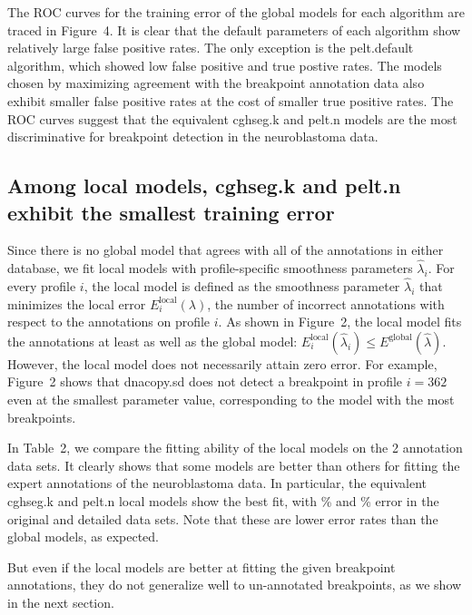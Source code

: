 \documentclass[10pt]{bmc_article}
\newcommand{\model}[1]{#1}
\newenvironment{bmcformat}{\begin{raggedright}\baselineskip20pt\sloppy\setboolean{publ}{false}}{\end{raggedright}\baselineskip20pt\sloppy}
\begin{document}
\begin{bmcformat}
The ROC curves for the training error of the global models for each
algorithm are traced in Figure~4. It is clear that the default
parameters of each algorithm show relatively large false positive
rates. The only exception is the pelt.default algorithm, which showed
low false positive and true postive rates. The models chosen by
maximizing agreement with the breakpoint annotation data also exhibit
smaller false positive rates at the cost of smaller true positive
rates. The ROC curves suggest that the equivalent \model{cghseg.k} and
\model{pelt.n} models are the most discriminative for breakpoint
detection in the neuroblastoma data.

\subsection*{Among local models, \model{cghseg.k} and \model{pelt.n}
  exhibit the smallest training error}

Since there is no global model that agrees with all of the annotations
in either database, we fit local models with profile-specific
smoothness parameters $\hat \lambda_i$. For every profile $i$, the
local model is defined as the smoothness parameter $\hat \lambda_i$
that minimizes the local error $E_i^{\text{local}}(\lambda)$, the
number of incorrect annotations with respect to the annotations on
profile $i$. As shown in Figure~2, the local model fits the
annotations at least as well as the global model:
$E_i^{\text{local}}(\hat \lambda_i)\leq E^{\text{global}}(\hat
\lambda)$. However, the local model does not necessarily attain zero
error. For example, Figure~2 shows that \model{dnacopy.sd} does not
detect a breakpoint in profile $i=362$ even at the smallest parameter
value, corresponding to the model with the most breakpoints.

In Table~2, we compare the fitting ability of the local models on the
2 annotation data sets. It clearly shows that some models are better
than others for fitting the expert annotations of the neuroblastoma
data. In particular, the equivalent \model{cghseg.k} and
\model{pelt.n} local models show the best fit, with
\unskip\% and \unskip\%
error in the original and detailed data sets. Note that these are
lower error rates than the global models, as expected.

But even if the local models are better at fitting the given
breakpoint annotations, they do not generalize well to un-annotated
breakpoints, as we show in the next section.


\end{bmcformat}
\end{document}
